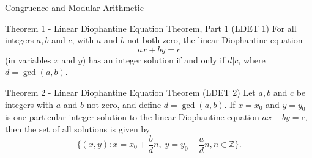 \documentclass[11pt, aspectratio=169]{beamer}
\begin{document}
\begin{frame}{Congruence and Modular
Arithmetic}

\begin{block}{Theorem 1 - Linear Diophantine Equation Theorem, Part 1 (LDET 1)}
For all integers $a, b$ and $c$, with $a$ and $b$ not both zero, the linear Diophantine equation $$ax + by = c$$
(in variables $x$ and $y$) has an integer solution if and only if $d |c$, where $d = \gcd(a, b)$.
\end{block}

\begin{block}{Theorem 2 - Linear Diophantine Equation Theorem (LDET 2)}
Let $a, b$ and $c$ be integers with $a$ and $b$ not zero, and define $d = \gcd(a,b)$. If $x = x_0$ and $y = y_0$ is one particular integer solution to the linear Diophantine equation $ax + by = c$, then the set of all solutions is given by
$$\{(x, y): x = x_0 + \frac{b}{d}n, \; y=y_0 - \frac{a}{d}n, n \in \mathbb{Z}\}.$$
\end{block}

\end{frame}
\end{document}
